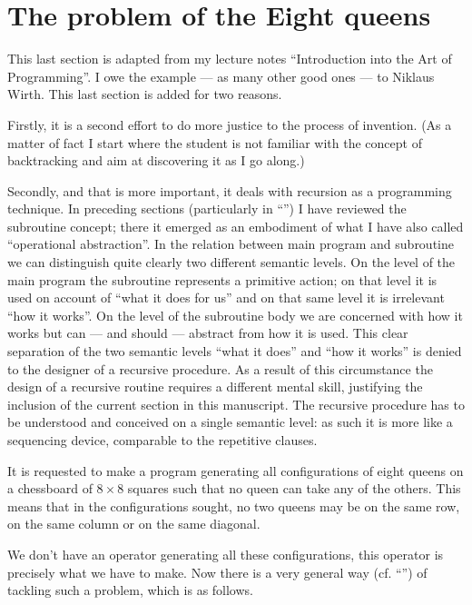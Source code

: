 \section{The problem of the Eight queens}

This last section is adapted from my lecture notes ``Introduction into the Art of Programming''. I owe the example --- as many other good ones --- to Niklaus Wirth. This last section is added for two reasons.

Firstly, it is a second effort to do more justice to the process of invention. (As a matter of fact I start where the student is not familiar with the concept of backtracking and aim at discovering it as I go along.)

Secondly, and that is more important, it deals with recursion as a programming technique. In preceding sections (particularly in ``'') I have reviewed the subroutine concept; there it emerged as an embodiment of what I have also called ``operational abstraction''. In the relation between main program and subroutine we can distinguish quite clearly two different semantic levels. On the level of the main program the subroutine represents a primitive action; on that level it is used on account of ``what it does for us'' and on that same level it is irrelevant ``how it works''. On the level of the subroutine body we are concerned with how it works but can --- and should --- abstract from how it is used. This clear separation of the two semantic levels ``what it does'' and ``how it works'' is denied to the designer of a recursive procedure. As a result of this circumstance the design of a recursive routine requires a different mental skill, justifying the inclusion of the current section in this manuscript. The recursive procedure has to be understood and conceived on a single semantic level: as such it is more like a sequencing device, comparable to the repetitive clauses.

It is requested to make a program generating all configurations of eight queens on a chessboard of $8\times 8$ squares such that no queen can take any of the others. This means that in the configurations sought, no two queens may be on the same row, on the same column or on the same diagonal.

We don't have an operator generating all these configurations, this operator is precisely what we have to make. Now there is a very general way (cf. ``'') of tackling such a problem, which is as follows.

